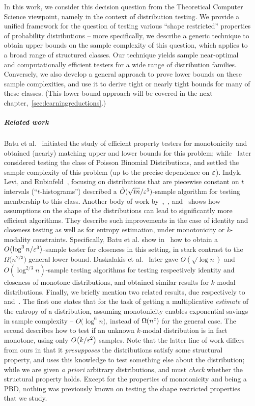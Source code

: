 In this work, we consider this decision question from the Theoretical Computer Science viewpoint, namely in the context of distribution testing. We provide a unified framework for the question of testing various ``shape restricted'' properties of probability distributions -- more specifically, we describe a generic technique to obtain upper bounds on the sample complexity of this question, which applies to a broad range of structured classes. Our technique yields sample near-optimal and computationally efficient testers for a wide range of distribution families. Conversely, we also develop a general approach to prove lower bounds on these sample complexities, and use it to derive tight or nearly tight bounds for many of these classes. (This lower bound approach will be covered in the next chapter,~\cref{sec:learningreductions}.)

\subparagraph{Related work} Batu et al.~\cite{BKR:04} initiated the study of efficient property testers for monotonicity and obtained (nearly) matching upper and lower bounds for this problem; while~\cite{AD:15} later considered testing the class of Poisson Binomial Distributions, and settled the sample complexity of this problem (up to the precise dependence on $\varepsilon$). Indyk, Levi, and Rubinfeld~\cite{ILR:12}, focusing on distributions that are piecewise constant on $t$ intervals (``$t$-histograms'') described a $\tilde{O}(\sqrt{tn}/\varepsilon^5)$-sample algorithm for testing membership to this class. Another body of work by~\cite{BDKR:05},~\cite{BKR:04}, and~\cite{DDSVV:13} shows how assumptions on the shape of the distributions can lead to significantly more efficient algorithms. They describe such improvements in the case of identity and closeness testing as well as for entropy estimation, under monotonicity or $k$-modality constraints. Specifically, Batu et al. show in~\cite{BKR:04} how to obtain a $O\big({\log^3 n/\varepsilon^3}\big)$-sample tester for closeness in this setting, in stark contrast to the $\Omega\big({{n}^{2/3}}\big)$ general lower bound. Daskalakis et al.~\cite{DDSVV:13} later gave ${O}(\sqrt{\log n})$ and ${O}({\log^{2/3} n})$-sample testing algorithms for testing respectively identity and closeness of monotone distributions, and obtained similar results for $k$-modal distributions. Finally, we briefly mention two related results, due respectively to~\cite{BDKR:05} and~\cite{DDS:12}. The first one states that for the task of getting a multiplicative \emph{estimate} of the entropy of a distribution, assuming monotonicity enables exponential savings in sample complexity -- $O\big({\log^6 n}\big)$, instead of $\bigOmega{n^c}$ for the general case. The second describes how to test if an unknown $k$-modal distribution is in fact monotone, using only $\bigO{k/\eps^2}$ samples. Note that the latter line of work differs from ours in that it \emph{presupposes} the distributions satisfy some structural property, and uses this knowledge to test something else about the distribution; while we are given \textit{a priori} arbitrary distributions, and must \emph{check} whether the structural property holds. Except for the properties of monotonicity and being a PBD, nothing was previously known on testing the shape restricted properties that we study.

